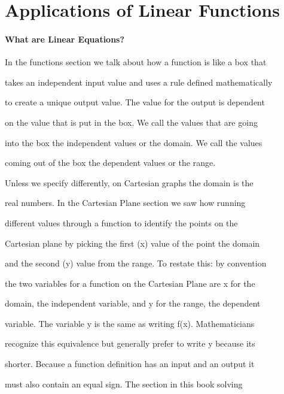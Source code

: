 \section{Applications of Linear Functions}
\label{sec:applications-of-linear-functions}

\paragraph{What are Linear Equations?}



In the functions section we talk about how a function is like a box that

takes an independent input value and uses a rule defined mathematically

to create a unique output value. The value for the output is dependent

on the value that is put in the box. We call the values that are going

into the box the independent values or the domain. We call the values

coming out of the box the dependent values or the range.



Unless we specify differently, on Cartesian graphs the domain is the

real numbers. In the Cartesian Plane section we saw how running

different values through a function to identify the points on the

Cartesian plane by picking the first (x) value of the point the domain

and the second (y) value from the range. To restate this: by convention

the two variables for a function on the Cartesian Plane are x for the

domain, the independent variable, and y for the range, the dependent

variable. The variable y is the same as writing f(x). Mathematicians

recognize this equivalence but generally prefer to write y because its

shorter. Because a function definition has an input and an output it

must also contain an equal sign. The section in this book solving

